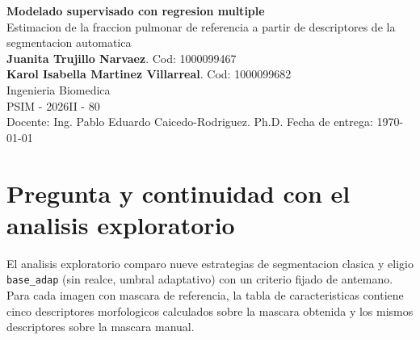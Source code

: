\documentclass[11pt,a4paper]{article}
\newcommand{\tituloTrabajo}{Modelado supervisado con regresion multiple}
\newcommand{\subtituloTrabajo}{Estimacion de la fraccion pulmonar de referencia a partir de descriptores de la segmentacion automatica}
\begin{document}
\thispagestyle{empty}
\begin{titlepage}
    \centering
    {\LARGE \textbf{\tituloTrabajo}}\\[0.6cm]
    {\large \subtituloTrabajo}\\[2cm]
    {\large \textbf{Juanita Trujillo Narvaez}. Cod: 1000099467}\\
    {\large \textbf{Karol Isabella Martinez Villarreal}. Cod: 1000099682}\\[1cm]
    {\large Ingenieria Biomedica}\\[0.4cm]
    {\large PSIM - 2026II - 80}\\
    Docente: Ing. Pablo Eduardo Caicedo-Rodriguez. Ph.D.
    \vfill
    Fecha de entrega: \today
\end{titlepage}

\tableofcontents
\newpage

\begin{abstract}
Este laboratorio extiende la tabla de caracteristicas del analisis exploratorio
con un modelo supervisado. Se pregunta si los descriptores de la segmentacion
automatica sin realce y con umbral adaptativo permiten estimar la fraccion
pulmonar que mide la mascara de referencia trazada por personas, en pacientes
que el modelo no uso para ajustar sus parametros. Se comparan la regresion
multiple de grado 1 y su extension polinomica de grado 2 con tres predictores,
frente a la media de entrenamiento como referencia sencilla. El modelo de
\ModElegidoNombre{}, elegido por RMSE de validacion, alcanzo en la prueba de
\ModNTest{} pacientes un RMSE de \ModRMSETest{} frente a \ModRMSETestBase{} de la
referencia ($R^2 = \ModRTest{}$). El error fue del mismo orden en los dos
origenes y sin sesgo medio apreciable, aunque Montgomery aporta pocos casos.
Se incluye ademas la practica comun con datos sinteticos, en la que se
desarrollan las rutas continua y binaria.
\end{abstract}

\newpage

\section{Pregunta y continuidad con el analisis exploratorio}

El analisis exploratorio comparo nueve estrategias de segmentacion clasica y
eligio \texttt{base\_adap} (sin realce, umbral adaptativo) con un criterio
fijado de antemano. Para cada imagen con mascara de referencia, la tabla de
caracteristicas contiene cinco descriptores morfologicos calculados sobre la
mascara obtenida y los mismos descriptores sobre la mascara manual.
\end{document}
